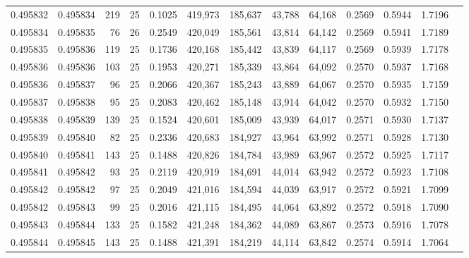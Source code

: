 \begin{tabular}{rrrrrrrrrrrrr}
0.495832 & 0.495834 &   219 &  25 &                                     0.1025 & 419,973 & 185,637 &  43,788 &  64,168 & 0.2569 & 0.5944 & 1.7196 \\
0.495834 & 0.495835 &    76 &  26 &                                     0.2549 & 420,049 & 185,561 &  43,814 &  64,142 & 0.2569 & 0.5941 & 1.7189 \\
0.495835 & 0.495836 &   119 &  25 &                                     0.1736 & 420,168 & 185,442 &  43,839 &  64,117 & 0.2569 & 0.5939 & 1.7178 \\
0.495836 & 0.495836 &   103 &  25 &                                     0.1953 & 420,271 & 185,339 &  43,864 &  64,092 & 0.2570 & 0.5937 & 1.7168 \\
0.495836 & 0.495837 &    96 &  25 &                                     0.2066 & 420,367 & 185,243 &  43,889 &  64,067 & 0.2570 & 0.5935 & 1.7159 \\
0.495837 & 0.495838 &    95 &  25 &                                     0.2083 & 420,462 & 185,148 &  43,914 &  64,042 & 0.2570 & 0.5932 & 1.7150 \\
0.495838 & 0.495839 &   139 &  25 &                                     0.1524 & 420,601 & 185,009 &  43,939 &  64,017 & 0.2571 & 0.5930 & 1.7137 \\
0.495839 & 0.495840 &    82 &  25 &                                     0.2336 & 420,683 & 184,927 &  43,964 &  63,992 & 0.2571 & 0.5928 & 1.7130 \\
0.495840 & 0.495841 &   143 &  25 &                                     0.1488 & 420,826 & 184,784 &  43,989 &  63,967 & 0.2572 & 0.5925 & 1.7117 \\
0.495841 & 0.495842 &    93 &  25 &                                     0.2119 & 420,919 & 184,691 &  44,014 &  63,942 & 0.2572 & 0.5923 & 1.7108 \\
0.495842 & 0.495842 &    97 &  25 &                                     0.2049 & 421,016 & 184,594 &  44,039 &  63,917 & 0.2572 & 0.5921 & 1.7099 \\
0.495842 & 0.495843 &    99 &  25 &                                     0.2016 & 421,115 & 184,495 &  44,064 &  63,892 & 0.2572 & 0.5918 & 1.7090 \\
0.495843 & 0.495844 &   133 &  25 &                                     0.1582 & 421,248 & 184,362 &  44,089 &  63,867 & 0.2573 & 0.5916 & 1.7078 \\
0.495844 & 0.495845 &   143 &  25 &                                     0.1488 & 421,391 & 184,219 &  44,114 &  63,842 & 0.2574 & 0.5914 & 1.7064 \\

\end{tabular}
